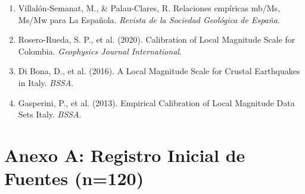 \documentclass[12pt,a4paper]{article}
\begin{document}
\begin{enumerate}
    \item Villalón-Semanat, M., \& Palau-Clares, R. Relaciones empíricas mb/Ms, Ms/Mw para La Española. \textit{Revista de la Sociedad Geológica de España}.
    \item Rosero-Rueda, S. P., et al. (2020). Calibration of Local Magnitude Scale for Colombia. \textit{Geophysics Journal International}.
    \item Di Bona, D., et al. (2016). A Local Magnitude Scale for Crustal Earthquakes in Italy. \textit{BSSA}.
    \item Gasperini, P., et al. (2013). Empirical Calibration of Local Magnitude Data Sets Italy. \textit{BSSA}.
\end{enumerate}

\section{Anexo A: Registro Inicial de Fuentes (n=120)}
\end{document}
